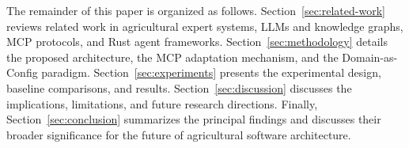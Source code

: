 The remainder of this paper is organized as follows. Section~\ref{sec:related-work} reviews related work in agricultural expert systems, LLMs and knowledge graphs, MCP protocols, and Rust agent frameworks. Section~\ref{sec:methodology} details the proposed architecture, the MCP adaptation mechanism, and the Domain-as-Config paradigm. Section~\ref{sec:experiments} presents the experimental design, baseline comparisons, and results. Section~\ref{sec:discussion} discusses the implications, limitations, and future research directions. Finally, Section~\ref{sec:conclusion} summarizes the principal findings and discusses their broader significance for the future of agricultural software architecture.
